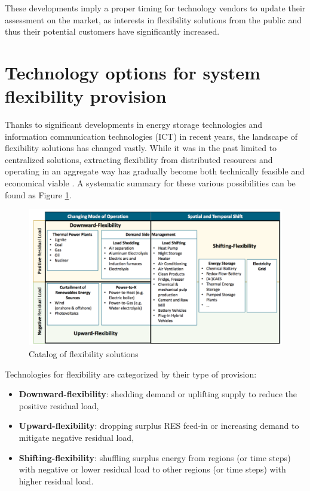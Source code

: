 These developments imply a proper timing for technology vendors to update their assessment on the market, as interests in flexibility solutions from the public and thus their potential customers have significantly increased.

\section[Technology options for system flexibility provision]{Technology options for system flexibility provision%
	}

Thanks to significant developments in energy storage technologies and information communication technologies (ICT) in recent years, the landscape of flexibility solutions has changed vastly. While it was in the past limited to centralized solutions, extracting flexibility from distributed resources and operating in an aggregate way has gradually become both technically feasible and economical viable \cite{Cochran2014,Wang2017,Lund2015,Muller2016}. A systematic summary for these various possibilities can be found as Figure \ref{fig:TechnologyOptions}.

\begin{figure}[h!]
	\centering
	\includegraphics[width=0.95\linewidth]{Figures/TechnologyOptions}
	\caption{Catalog of flexibility solutions \cite{Muller2016}}
	\label{fig:TechnologyOptions}
\end{figure}

Technologies for flexibility are categorized by their type of provision:

\begin{itemize}
	\item \textbf{Downward-flexibility}: shedding demand or uplifting supply to reduce the positive residual load,
	\item \textbf{Upward-flexibility}: dropping surplus RES feed-in or increasing demand to mitigate negative residual load,
	\item  \textbf{Shifting-flexibility}: shuffling surplus energy from regions (or time steps) with negative or lower residual load to other regions (or time steps) with higher residual load.
\end{itemize}

